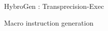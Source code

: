 \begin{Frame}{HybroGen : Transprecision-Exec}
  \begin{block}{Macro instruction generation}
    
  \end{block}

\end{Frame}
